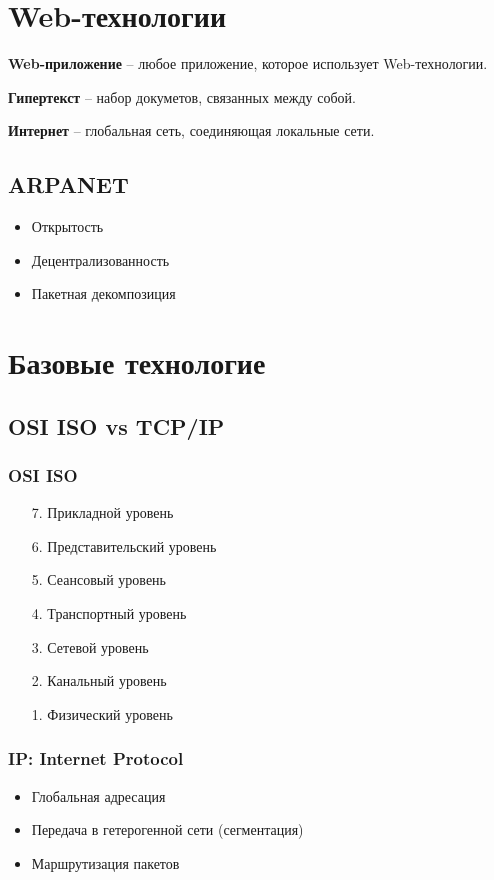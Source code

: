 





\section{Web-технологии}

\textbf{Web-приложение} -- любое приложение, которое использует Web-технологии.

\textbf{Гипертекст} -- набор докуметов, связанных между собой.

\textbf{Интернет} -- глобальная сеть, соединяющая локальные сети.

\subsection{ARPANET}

\begin{itemize}
    \item Открытость
    \item Децентрализованность
    \item Пакетная декомпозиция
\end{itemize}

\section{Базовые технологие}

\subsection{OSI ISO vs TCP/IP}

\subsubsection{OSI ISO}

\begin{enumerate}
    \item[7.] Прикладной уровень
    \item[6.] Представительский уровень
    \item[5.] Сеансовый уровень
    \item[4.] Транспортный уровень
    \item[3.] Сетевой уровень
    \item[2.] Канальный уровень
    \item[1.] Физический уровень
\end{enumerate}

\subsubsection{IP: Internet Protocol}

\begin{itemize}
    \item Глобальная адресация
    \item Передача в гетерогенной сети (сегментация)
    \item Маршрутизация пакетов
\end{itemize}


